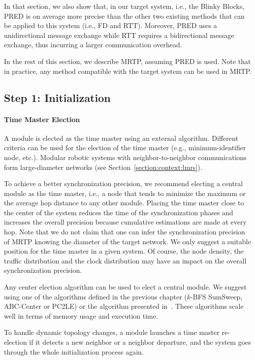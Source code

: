 In that section, we also show that, in our target system, i.e., the Blinky Blocks, PRED is on average more precise than the other two existing methods that can be applied to this system (i.e., FD and RTT). Moreover, PRED uses a unidirectional message exchange while RTT requires a bidirectional message exchange, thus incurring a larger communication overhead.

In the rest of this section, we describe MRTP, assuming PRED is used. Note that in practice, any method compatible with the target system can be used in MRTP.

\subsection{Step 1: Initialization}

\paragraph{Time Master Election}

A module is elected as the time master using an external algorithm. Different criteria can be used for the election of the time master (e.g., minimum-identifier node, etc.). Modular robotic systems with neighbor-to-neighbor communications form large-diameter networks (see Section~\ref{section:context:lmrs}). 

To achieve a better synchronization precision, we recommend electing a central module as the time master, i.e., a node that tends to minimize the maximum or the average hop distance to any other module. Placing the time master close to the center of the system reduces the time of the synchronization phases and increases the overall precision because cumulative estimations are made at every hop. Note that we do not claim that one can infer the synchronization precision of MRTP knowing the diameter of the target network. We only suggest a suitable position for the time master in a given system. Of course, the node density, the traffic distribution and the clock distribution may have an impact on the overall synchronization precision.

Any center election algorithm can be used to elect a central module. We suggest using one of the algorithms defined in the previous chapter ($k$-BFS SumSweep, ABC-Center or PC2LE) or the algorithm presented in~\cite{kim2013leader}. These algorithms scale well in terms of memory usage and execution time.

To handle dynamic topology changes, a module launches a time master re-election if it detects a new neighbor or a neighbor departure, and the system goes through the whole initialization process again.

